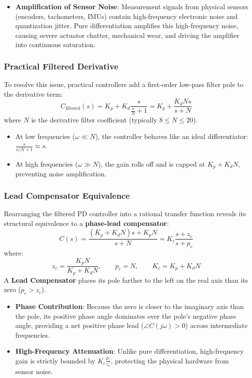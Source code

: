 \documentclass[12pt,onecolumn,twoside ]{article}
\begin{document}
	\begin{itemize}
		\item
		\textbf{Amplification of Sensor Noise}: Measurement signals from physical sensors (encoders, tachometers, IMUs) contain high-frequency electronic noise and quantization jitter. Pure differentiation amplifies this high-frequency noise, causing severe actuator chatter, mechanical wear, and driving the amplifier into continuous saturation.
	\end{itemize}
	\subsubsection{Practical Filtered Derivative}
	To resolve this issue, practical controllers add a first-order low-pass filter pole to the derivative term: \[
	C_{\text{filtered}}(s) = K_p + K_d \frac{s}{\frac{s}{N} + 1} = K_p + \frac{K_d N s}{s + N}
	\] where $N$ is the derivative filter coefficient (typically $8 \le N \le 20$).
	\begin{itemize}
		\item
		At low frequencies ($\omega \ll N$), the controller behaves like an ideal differentiator: $\frac{s}{s/N + 1} \approx s$.
		\item
		At high frequencies ($\omega \gg N$), the gain rolls off and is capped at $K_p + K_d N$, preventing noise amplification.
	\end{itemize}
	\subsubsection{Lead Compensator Equivalence}
	Rearranging the filtered PD controller into a rational transfer function reveals its structural equivalence to a \textbf{phase-lead compensator}: \[
	C(s) = \frac{(K_p + K_d N)s + K_p N}{s + N} = K_c \frac{s + z_c}{s + p_c}
	\] where: \[
	z_c = \frac{K_p N}{K_p + K_d N}, \qquad p_c = N, \qquad K_c = K_p + K_d N
	\]
	A \textbf{Lead Compensator} places its pole farther to the left on the real axis than its zero ($p_c > z_c$).
	\begin{itemize}
		\item
		\textbf{Phase Contribution}: Because the zero is closer to the imaginary axis than the pole, its positive phase angle dominates over the pole's negative phase angle, providing a net positive phase lead ($\angle C(j\omega) > 0$) across intermediate frequencies.
		\item
		\textbf{High-Frequency Attenuation}: Unlike pure differentiation, high-frequency gain is strictly bounded by $K_c \frac{p_c}{z_c}$, protecting the physical hardware from sensor noise.
	\end{itemize}
	
\end{document}
